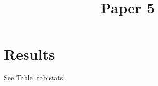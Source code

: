 \documentclass{ieeeaccess}
\begin{document}
\title{Paper 5}
\section{Results}
See Table \ref{tab:stats}.
\end{document}

